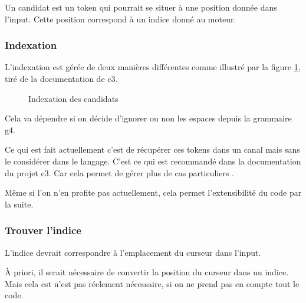 \documentclass[
    iict, %
    il, %
]{heig-tb}
\begin{document}
Un candidat est un token qui pourrait se situer à une position donnée dans l'input.
Cette position correspond à un indice donné au moteur.

\subsubsection{Indexation}
L'indexation est gérée de deux manières différentes comme illustré par la figure \ref{candidat-index}, tiré de la documentation de c3.

\begin{figure}[!h]
    \begin{center}
    \end{center}
    \caption[Indexation des candidats]{\label{candidat-index} Indexation des candidats}
\end{figure}

Cela va dépendre si on décide d'ignorer ou non les espaces depuis la grammaire g4.

Ce qui est fait actuellement c'est de récupérer ces tokens dans un canal mais sans le considérer dans le langage.
C'est ce qui est recommandé dans la documentation du projet c3. Car cela permet de gérer plus de cas particuliers \cite{c3-example-soql}.

Même si l'on n'en profite pas actuellement, cela permet l'extensibilité du code par la suite. %


\subsubsection{Trouver l'indice}

L'indice devrait correspondre à l'emplacement du curseur dans l'input.

À priori, il serait nécessaire de convertir la position du curseur dans un indice.
Mais cela est n'est pas réelement nécessaire, si on ne prend pas en compte tout le code.
\end{document}

